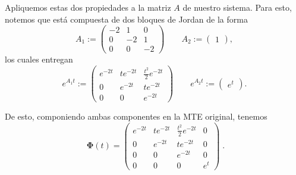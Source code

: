 \documentclass[
  11pt,
  letterpaper,
   addpoints,
   answers
  ]{exam}
\begin{document}
\begin{questions}
\begin{solution}
Apliquemos estas dos propiedades a la matriz $A$ de nuestro sistema. Para esto, notemos que está compuesta de dos bloques de Jordan de la forma
\begin{equation}
A_1:=\begin{pmatrix}
-2 & 1 & 0\\
0 & -2 & 1\\
0 & 0 & -2
\end{pmatrix}
\qquad
A_2:=\begin{pmatrix}1\end{pmatrix},
\end{equation}
los cuales entregan
\begin{equation}
e^{A_1 t}:=\begin{pmatrix}
e^{-2t} & t e^{-2t} & \tfrac{t^{2}}{2} e^{-2t}\\
0 & e^{-2t} & t e^{-2t}\\
0 & 0 & e^{-2t}
\end{pmatrix}
\qquad
e^{A_2 t}:=\begin{pmatrix} e^{t}\end{pmatrix}.
\end{equation}

De esto, componiendo ambas componentes en la MTE original, tenemos
\begin{equation}
\boxed{\;
\bm{\Phi}(t)=
\begin{pmatrix}
e^{-2t} & t e^{-2t} & \tfrac{t^{2}}{2} e^{-2t} & 0\\
0 & e^{-2t} & t e^{-2t} & 0\\
0 & 0 & e^{-2t} & 0\\
0 & 0 & 0 & e^{t}
\end{pmatrix}
\; }.
\end{equation}


\end{solution}
\end{questions}
\end{document}
